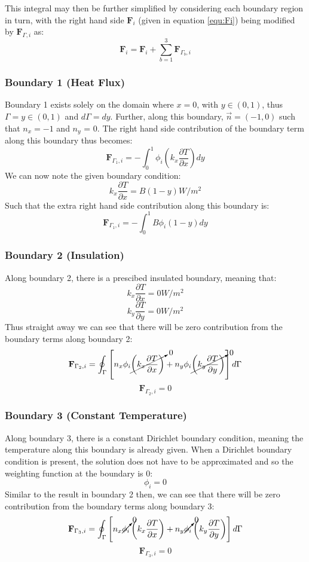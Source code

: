 \documentclass[letterpaper,10pt]{article}
\begin{document}
\noindent This integral may then be further simplified by considering each boundary region in turn, with the right hand side $\mathbf{F}_i$ (given in equation \ref{equ:Fi}) being modified by $\mathbf{F}_{\Gamma,i}$ as:
\[
\boxed{\mathbf{F}_i = \mathbf{F}_i + \displaystyle\sum\limits_{b=1}^3 \mathbf{F}_{\Gamma_b,i}}
\]

\subsubsection{Boundary 1 (Heat Flux)}
Boundary 1 exists solely on the domain where $x=0$, with $y \in (0, 1)$, thus $\Gamma = y \in (0, 1)$ and $d\Gamma = dy$. Further, along this boundary, $\vec{n} = \left(-1,0\right)$ such that $n_x=-1$ and $n_y$ = 0. The right hand side contribution of the boundary term along this boundary thus becomes:
\[\mathbf{F}_{\Gamma_1,i} = -\int_0^1 \phi_i\left(k_x\frac{\partial T}{\partial x}\right)dy\]
We can now note the given boundary condition:
\[k_x\frac{\partial T}{\partial x} = B \left(1-y\right) \unit{}{W/m^2}\]
Such that the extra right hand side contribution along this boundary is:
\begin{equation}
\label{equ:F1i}
\boxed{\mathbf{F}_{\Gamma_1,i} = -\int_0^1 B \phi_i \left(1-y\right)dy}
\end{equation}

\subsubsection{Boundary 2 (Insulation)}
Along boundary 2, there is a prescibed insulated boundary, meaning that:
\[k_x\frac{\partial T}{\partial x} = \unit{0}{W/m^2}\]
\[k_y\frac{\partial T}{\partial y} = \unit{0}{W/m^2}\]
\noindent Thus straight away we can see that there will be zero contribution from the boundary terms along boundary 2:
\[
\mathbf{F}_{\Gamma_2,i} = \oint_\Gamma \left[n_x\phi_i\cancelto{0}{\left(k_x\frac{\partial T}{\partial x}\right)} + n_y\phi_i\cancelto{0}{\left(k_y\frac{\partial T}{\partial y}\right)}\right]d\Gamma
\]
\begin{equation}
\label{equ:F2i}
\boxed{\mathbf{F}_{\Gamma_2,i} = 0}
\end{equation}

\subsubsection{Boundary 3 (Constant Temperature)}
Along boundary 3, there is a constant Dirichlet boundary condition, meaning the temperature along this boundary is already given. When a Dirichlet boundary condition is present, the solution does not have to be approximated and so the weighting function at the boundary is 0:
\[\phi_i = 0\]
\noindent Similar to the result in boundary 2 then, we can see that there will be zero contribution from the boundary terms along boundary 3:
\[
\mathbf{F}_{\Gamma_3,i} = \oint_\Gamma \left[n_x\cancelto{0}{\phi_i}\left(k_x\frac{\partial T}{\partial x}\right) + n_y\cancelto{0}{\phi_i}\left(k_y\frac{\partial T}{\partial y}\right)\right]d\Gamma
\]
\begin{equation}
\label{equ:F3i}
\boxed{\mathbf{F}_{\Gamma_3,i} = 0}
\end{equation}
\end{document}
